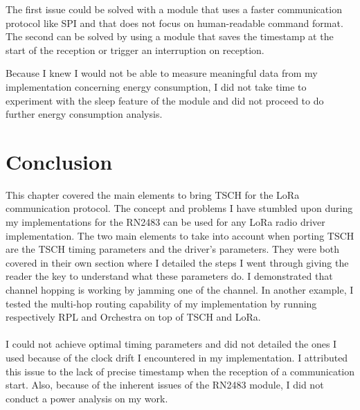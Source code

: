 
The first issue could be solved with a module that uses a faster communication
protocol like SPI and that does not focus on human-readable command format.
The second can be solved by using a module that saves the timestamp at the start
of the reception or trigger an interruption on reception.

Because I knew I would not be able to measure meaningful data from my
implementation concerning energy consumption, I did not take time to experiment
with the sleep feature of the module and did not proceed to do further energy
consumption analysis.

\section{Conclusion}

This chapter covered the main elements to bring TSCH for the LoRa communication
protocol.
The concept and problems I have stumbled upon during my implementations for the
RN2483 can be used for any LoRa radio driver implementation.
The two main elements to take into account when porting TSCH are the TSCH timing
parameters and the driver's parameters.
They were both covered in their own section where I detailed the steps I went
through giving the reader the key to understand what these parameters do.
I demonstrated that channel hopping is working by jamming one of
the channel.
In another example, I tested the multi-hop routing capability of my
implementation by running respectively RPL and Orchestra on top of TSCH and
LoRa.

\paragraph{}

I could not achieve optimal timing parameters and did not detailed the ones
I used because of the clock drift I encountered in my
implementation.
I attributed this issue to the lack of precise timestamp when the reception of
a communication start.
Also, because of the inherent issues of the RN2483 module, I did not conduct
a power analysis on my work.
